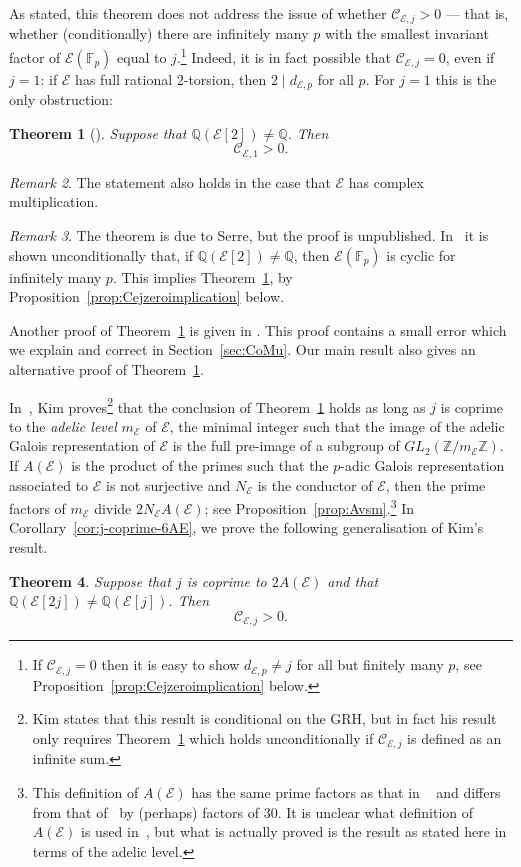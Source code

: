 \documentclass{amsart}
\theoremstyle{plain}
\newtheorem{theorem}{Theorem}[section]
\theoremstyle{remark}
\newtheorem{rem}[theorem]{Remark}
\newtheorem{remark}[theorem]{Remark}
\newcommand{\F}{\mathbb{F}}
\newcommand{\Q}{\mathbb{Q}}
\newcommand{\Z}{\mathbb{Z}}
\newcommand{\E}{\mathcal{E}}
\newcommand{\Cc}{\mathcal{C}}
\begin{document}
As stated, this theorem does not address the issue of whether $\mathcal{C}_{\E,j} > 0$ --- that is, whether
(conditionally) there are infinitely many $p$ with the smallest invariant factor of $\E(\F_p)$ equal to $j$.\footnote{If
  $\Cc_{\E,j} = 0$ then it is easy to show $d_{\E, p} \ne j$ for all but finitely many $p$, see Proposition~\ref{prop:Cejzeroimplication}
  below.} Indeed, it is in fact possible that $\mathcal{C}_{\E,j} = 0$, even if $j = 1$: if $\E$ has full rational
$2$-torsion, then $2 \mid d_{\E,p}$ for all $p$. For $j = 1$ this is the only obstruction:
\begin{theorem}[{\cite[Theorem 1.1]{serreResumeDesCours}}] \label{thm:CE1}Suppose that $\Q(\E[2]) \ne \Q$. Then \[\Cc_{\E, 1} > 0.\]
\end{theorem}
\begin{rem}
    The statement also holds in the case that $\E$ has complex multiplication.
\end{rem}


\begin{remark}\label{rem:CE1-proofs} The theorem is due to Serre, but the proof is unpublished.  In~\cite[Theorem~1]{guptaCyclicityGenerationPoints1990} it is shown unconditionally that, if $\Q(\E[2])\ne \Q$, then $\E(\F_p)$ is cyclic for infinitely many $p$. This implies Theorem~\ref{thm:CE1}, by
  Proposition~\ref{prop:Cejzeroimplication} below.

  Another proof of Theorem~\ref{thm:CE1} is given in \cite[Section 6]{CoMu}. This proof contains a small error which we explain and correct in Section~\ref{sec:CoMu}. Our main result also gives an alternative proof of Theorem~\ref{thm:CE1}.
\end{remark} 



In~\cite{Kim}, Kim proves\footnote{Kim states that this result is conditional on the GRH, but in fact his result only
  requires Theorem~\ref{thm:CE1} which holds unconditionally if $\Cc_{\E,j}$ is defined as an infinite sum.} that the
conclusion of Theorem~\ref{thm:CE1} holds as long as $j$ is coprime to the \emph{adelic level} $m_\E$ of $\E$, the
minimal integer such that the image of the adelic Galois representation of $\E$ is the full pre-image of a subgroup of
$GL_2(\Z/m_\E\Z)$. If $A(\E)$ is the product of the primes such that the $p$-adic Galois representation associated to
$\E$ is not surjective and $N_\E$ is the conductor of $\E$, then the prime factors of $m_\E$ divide $2N_\E A(\E)$; see
Proposition~\ref{prop:Avsm}.\footnote{This definition of $A(\E)$ has the same prime factors as that in
  ~\cite{danielsSerresConstantElliptic2022} and differs from that of~\cite{cojocaruSurjectivityGaloisRepresentations2005}
  by (perhaps) factors of 30. It is unclear what definition of $A(\E)$ is used in~\cite{Kim}, but what is actually
  proved is the result as stated here in terms of the adelic level.} In Corollary~\ref{cor:j-coprime-6AE}, we prove the
following generalisation of Kim's result.
\begin{theorem} Suppose that $j$ is coprime to $2A(\E)$ and that $\Q(\E[2j]) \ne \Q(\E[j])$. Then \[\Cc_{\E, j} > 0.\]
\end{theorem}
\end{document}
